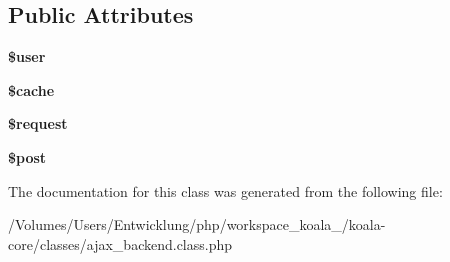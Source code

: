 \subsection*{Public Attributes}
\begin{DoxyCompactItemize}
\item 
\hypertarget{classajax__backend_a6bb2efbef644b41f4a23cf910edfebd6}{
{\bfseries \$user}}
\label{classajax__backend_a6bb2efbef644b41f4a23cf910edfebd6}

\item 
\hypertarget{classajax__backend_a4389493f58d92093b1388a780038e449}{
{\bfseries \$cache}}
\label{classajax__backend_a4389493f58d92093b1388a780038e449}

\item 
\hypertarget{classajax__backend_a88309f89e00284a40729fa6347a0e683}{
{\bfseries \$request}}
\label{classajax__backend_a88309f89e00284a40729fa6347a0e683}

\item 
\hypertarget{classajax__backend_a66222178d29d8ea6298b6c630da88be9}{
{\bfseries \$post}}
\label{classajax__backend_a66222178d29d8ea6298b6c630da88be9}

\end{DoxyCompactItemize}


The documentation for this class was generated from the following file:\begin{DoxyCompactItemize}
\item 
/Volumes/Users/Entwicklung/php/workspace\_\-koala\_/koala-\/core/classes/ajax\_\-backend.class.php\end{DoxyCompactItemize}
